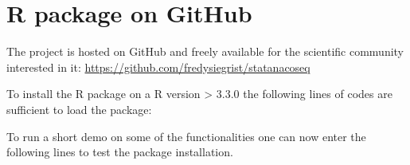 \chapter{R package on GitHub}
The project is hosted on GitHub and freely available for the scientific community interested in it:
\href{https://github.com/fredysiegrist/statanacoseq}{https://github.com/fredysiegrist/statanacoseq}

To install the R package on a R version > 3.3.0 the following lines of codes are sufficient to load the package:

  

To run a short demo on some of the functionalities one can now enter the following lines to test the package installation.

  